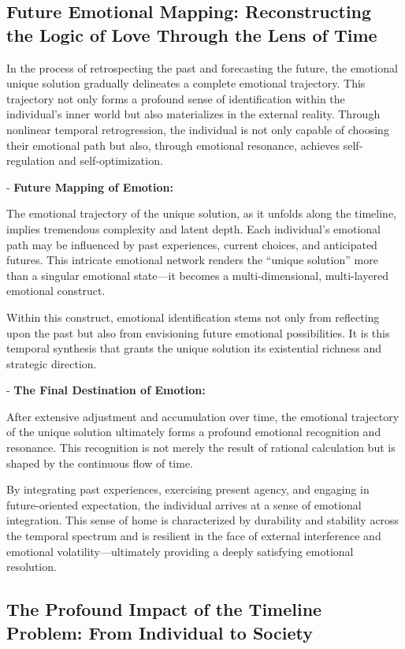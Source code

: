 \documentclass{article}
\begin{document}
\subsection{Future Emotional Mapping: Reconstructing the Logic of Love Through the Lens of Time}

In the process of retrospecting the past and forecasting the future, the emotional unique solution gradually delineates a complete emotional trajectory. This trajectory not only forms a profound sense of identification within the individual's inner world but also materializes in the external reality. Through nonlinear temporal retrogression, the individual is not only capable of choosing their emotional path but also, through emotional resonance, achieves self-regulation and self-optimization.

- \textbf{Future Mapping of Emotion:}

The emotional trajectory of the unique solution, as it unfolds along the timeline, implies tremendous complexity and latent depth. Each individual’s emotional path may be influenced by past experiences, current choices, and anticipated futures. This intricate emotional network renders the “unique solution” more than a singular emotional state—it becomes a multi-dimensional, multi-layered emotional construct.

Within this construct, emotional identification stems not only from reflecting upon the past but also from envisioning future emotional possibilities. It is this temporal synthesis that grants the unique solution its existential richness and strategic direction.

- \textbf{The Final Destination of Emotion:}

After extensive adjustment and accumulation over time, the emotional trajectory of the unique solution ultimately forms a profound emotional recognition and resonance. This recognition is not merely the result of rational calculation but is shaped by the continuous flow of time.

By integrating past experiences, exercising present agency, and engaging in future-oriented expectation, the individual arrives at a sense of emotional integration. This sense of home is characterized by durability and stability across the temporal spectrum and is resilient in the face of external interference and emotional volatility—ultimately providing a deeply satisfying emotional resolution.

\subsection{The Profound Impact of the Timeline Problem: From Individual to Society}
\end{document}
